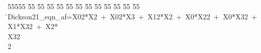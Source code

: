 %
%
\begin{tabbing}
55555 \= 55 \= 55 \= 55 \= 55 \= 55 \= 55 \= 55 \= 55 \= 55 \= 55 \= 55 \= 55 \= \>Dickson21\_eqn\_af=X02*X2\ +\ X02*X3\ +\ X12*X2\ +\ X0*X22\ +\ X0*X32\ +\ X1*X32\ +\ X2*\\[0pt]
\>X32\\[0pt]
2\>\end{tabbing}
